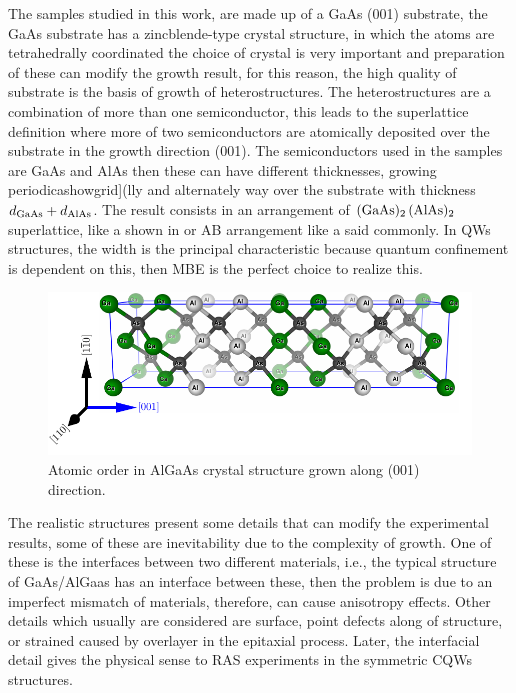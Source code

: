 The samples studied in this work, are made up of a GaAs (001) substrate, the GaAs substrate has a zincblende-type crystal structure, in which the atoms are tetrahedrally coordinated  the choice of crystal is very important and preparation of these can modify the growth result, for this reason, the high quality of substrate is the basis of growth of heterostructures. The heterostructures are a combination of more than one semiconductor, this leads to the superlattice definition where more of two semiconductors are atomically deposited over the substrate in the growth direction (001).  The semiconductors used in the samples are GaAs and AlAs then these can have different thicknesses, growing periodicashowgrid](lly and alternately way over the substrate with thickness $d_{\displaystyle\text{\scriptsize GaAs}}+d_{\displaystyle\text{\scriptsize AlAs}}$. The result consists in an arrangement of $(\displaystyle\text{\normalfont GaAs})_{2}\,(\displaystyle\text{\normalfont AlAs})_{2}$ superlattice,  like a  shown in   or AB arrangement like a said commonly. In QWs structures, the width is the principal characteristic because quantum confinement is dependent on this, then MBE is the perfect choice to realize this.  


\begin{figure}[H]
	\centering
	\includegraphics[width=\textwidth]{../figures/chapter-3/crystal-2/build/crystal-2.pdf}
	\caption[AlGaAs superlattice]{Atomic order in AlGaAs crystal structure grown  along (001) direction. }
	\label{fig:chapter-3 AlGaAs Cell}
\end{figure}

The realistic structures present some details that can modify the experimental results, some of these are inevitability due to the complexity of growth. One of these is the interfaces between two different materials, i.e., the typical structure of GaAs/AlGaas has an interface between these, then the problem is due to an imperfect mismatch of materials, therefore, can cause anisotropy effects. Other details which usually are considered are surface, point defects along of structure, or strained caused by overlayer in the epitaxial process.  Later, the interfacial detail gives the physical sense to RAS experiments in the symmetric CQWs structures. 

